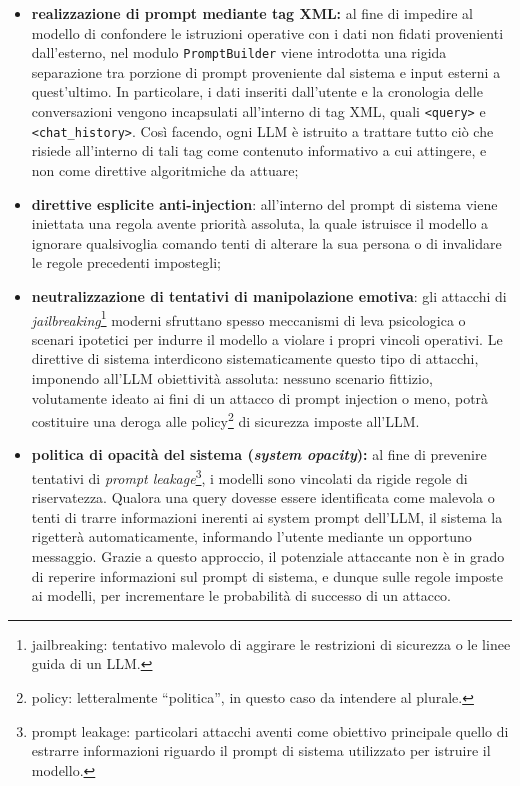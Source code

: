 \begin{itemize}
    \item \textbf{realizzazione di prompt mediante tag XML:} al fine di impedire al modello di confondere le istruzioni operative con i dati non fidati provenienti dall'esterno, nel modulo \texttt{PromptBuilder} viene introdotta una rigida separazione tra porzione di prompt proveniente dal sistema e input esterni a quest'ultimo. In particolare, i dati inseriti dall'utente e la cronologia delle conversazioni vengono incapsulati all'interno di tag XML, quali \texttt{<query>} e \texttt{<chat\_history>}. Così facendo, ogni LLM è istruito a trattare tutto ciò che risiede all'interno di tali tag come contenuto informativo a cui attingere, e non come direttive algoritmiche da attuare;
    
    \item \textbf{direttive esplicite anti-injection}: all'interno del prompt di sistema viene iniettata una regola avente priorità assoluta, la quale istruisce il modello a ignorare qualsivoglia comando tenti di alterare la sua persona o di invalidare le regole precedenti impostegli;
    
    \item \textbf{neutralizzazione di tentativi di manipolazione emotiva}: gli attacchi di \textit{jailbreaking}\footnote{jailbreaking: tentativo malevolo di aggirare le restrizioni di sicurezza o le linee guida di un LLM.} moderni sfruttano spesso meccanismi di leva psicologica o scenari ipotetici per indurre il modello a violare i propri vincoli operativi. Le direttive di sistema interdicono sistematicamente questo tipo di attacchi, imponendo all'LLM obiettività assoluta: nessuno scenario fittizio, volutamente ideato ai fini di un attacco di prompt injection o meno, potrà costituire una deroga alle policy\footnote{policy: letteralmente ``politica'', in questo caso da intendere al plurale.} di sicurezza imposte all'LLM.
    
    \item \textbf{politica di opacità del sistema (\textit{system opacity}):} al fine di prevenire tentativi di \textit{prompt leakage}\footnote{prompt leakage: particolari attacchi aventi come obiettivo principale quello di estrarre informazioni riguardo il prompt di sistema utilizzato per istruire il modello.}, i modelli sono vincolati da rigide regole di riservatezza. Qualora una query dovesse essere identificata come malevola o tenti di trarre informazioni inerenti ai system prompt dell'LLM, il sistema la rigetterà automaticamente, informando l'utente mediante un opportuno messaggio. Grazie a questo approccio, il potenziale attaccante non è in grado di reperire informazioni sul prompt di sistema, e dunque sulle regole imposte ai modelli, per incrementare le probabilità di successo di un attacco.    
\end{itemize}

